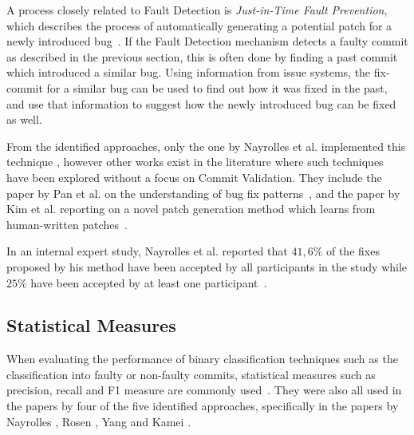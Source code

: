 A process closely related to Fault Detection is \textit{Just-in-Time Fault Prevention}, which describes the process of automatically generating a potential patch for a newly introduced bug~\cite{Nayrolles2018}. If the Fault Detection mechanism detects a faulty commit as described in the previous section, this is often done by finding a past commit which introduced a similar bug. Using information from issue systems, the fix-commit for a similar bug can be used to find out how it was fixed in the past, and use that information to suggest how the newly introduced bug can be fixed as well.

From the identified approaches, only the one by Nayrolles et al. implemented this technique \cite{Nayrolles2018}, 
however other works exist
in the literature where such techniques have been explored without a focus on Commit Validation. %
They include the paper by Pan et al. on the understanding of bug fix patterns~\cite{Pan2009}, and the paper by Kim et al. reporting on a novel patch generation method which learns from human-written patches~\cite{Kim2013}.

In an internal expert study, Nayrolles et al. reported that $41,6\%$ of the fixes proposed by his method have been accepted by all participants in the study while $25\%$ have been accepted by at least one participant~\cite{Nayrolles2018}.

\subsection{Statistical Measures}
\label{sec:statisticalmeasures}


When evaluating the performance of binary classification techniques such as the classification into faulty or non-faulty commits, statistical measures such as precision, recall and F1 measure are commonly used~\cite{Powers2007}. They were also all used in the papers by four of the five identified approaches, specifically in the papers by Nayrolles \cite{Nayrolles2018}, Rosen \cite{Rosen2015}, Yang \cite{Yang2015} and Kamei \cite{Kamei2013}.


